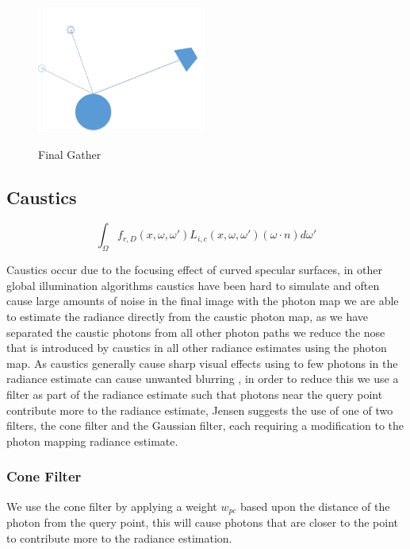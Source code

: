 \begin{figure}
\centering
\includegraphics[width=0.5\textwidth]{./images/final_gather.png}
\label{fig:final_gather}
\caption{Final Gather}
\end{figure}

\subsection{Caustics}
\begin{equation*}
		\int_{\Omega}
			f_{r,D}(x, \omega, \omega')
			L_{i,c}(x,\omega,\omega')
			(\omega \cdot n)d\omega'
\end{equation*}

Caustics occur due to the focusing effect of curved specular surfaces, in other global illumination algorithms
caustics have been hard to simulate \cite{Jensen96a} and often cause large amounts of noise in the final image
with the photon map we are able to estimate the radiance directly from the caustic photon map, as we have separated the
caustic photons from all other photon paths we reduce the nose that is introduced by caustics in all other radiance
estimates using the photon map. As caustics generally cause sharp visual effects using to few photons in the radiance
estimate can cause unwanted blurring \cite{JensenBook}, in order to reduce this we use a filter as part of the radiance estimate such
that photons near the query point contribute more to the radiance estimate, Jensen suggests the use of one of two filters, the
cone filter and the Gaussian filter, each requiring a modification to the photon mapping radiance estimate.

\subsubsection{Cone Filter}
We use the cone filter by applying a weight $w_{pc}$ based upon the distance of the photon from the query point, this will
cause photons that are closer to the point to contribute more to the radiance estimation.

